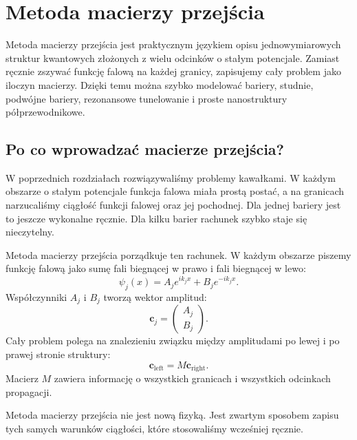 \chapter{Metoda macierzy przejścia}

\begin{summarybox}
Metoda macierzy przejścia jest praktycznym językiem opisu jednowymiarowych
struktur kwantowych złożonych z wielu odcinków o stałym potencjale. Zamiast
ręcznie zszywać funkcję falową na każdej granicy, zapisujemy cały problem jako
iloczyn macierzy. Dzięki temu można szybko modelować bariery, studnie,
podwójne bariery, rezonansowe tunelowanie i proste nanostruktury
półprzewodnikowe.
\end{summarybox}

\section{Po co wprowadzać macierze przejścia?}

W poprzednich rozdziałach rozwiązywaliśmy problemy kawałkami. W każdym obszarze o stałym potencjale funkcja falowa miała prostą postać, a na granicach narzucaliśmy ciągłość funkcji falowej oraz jej pochodnej. Dla jednej bariery jest to jeszcze wykonalne ręcznie. Dla kilku barier rachunek szybko staje się nieczytelny.

Metoda macierzy przejścia porządkuje ten rachunek. W każdym obszarze piszemy funkcję falową jako sumę fali biegnącej w prawo i fali biegnącej w lewo:
\begin{equation}
    \psi_j(x)=A_j e^{ik_j x}+B_j e^{-ik_j x}.
\end{equation}
Współczynniki \(A_j\) i \(B_j\) tworzą wektor amplitud:
\begin{equation}
    \mathbf{c}_j=\begin{pmatrix}A_j\\ B_j\end{pmatrix}.
\end{equation}
Cały problem polega na znalezieniu związku między amplitudami po lewej i po prawej stronie struktury:
\begin{equation}
    \mathbf{c}_{\mathrm{left}}=M\mathbf{c}_{\mathrm{right}}.
\end{equation}
Macierz \(M\) zawiera informację o wszystkich granicach i wszystkich odcinkach propagacji.

\begin{remarkbox}
Metoda macierzy przejścia nie jest nową fizyką. Jest zwartym sposobem zapisu tych samych warunków ciągłości, które stosowaliśmy wcześniej ręcznie.
\end{remarkbox}

